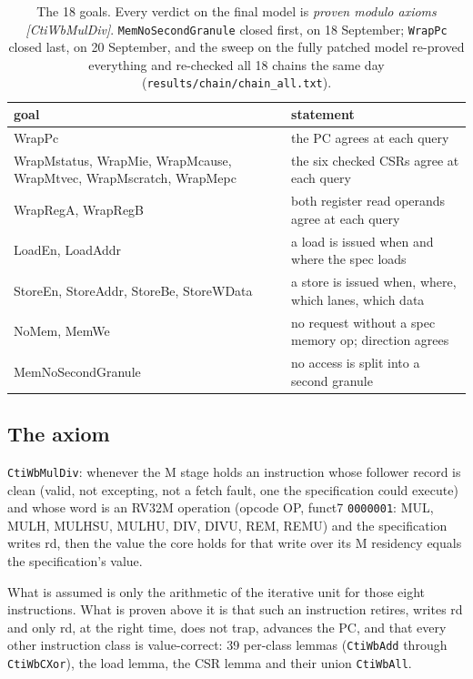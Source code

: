 \documentclass[11pt]{article}
\newcommand{\code}[1]{\texttt{#1}}
\begin{document}
\begin{table}[h]
\centering
\small
\begin{tabular}{p{}p{}}
\toprule
goal & statement \\
\midrule
WrapPc & the PC agrees at each query \\
WrapMstatus, WrapMie, WrapMcause, WrapMtvec, WrapMscratch, WrapMepc & the six checked CSRs agree at each query \\
WrapRegA, WrapRegB & both register read operands agree at each query \\
LoadEn, LoadAddr & a load is issued when and where the spec loads \\
StoreEn, StoreAddr, StoreBe, StoreWData & a store is issued when, where, which lanes, which data \\
NoMem, MemWe & no request without a spec memory op; direction agrees \\
MemNoSecondGranule & no access is split into a second granule \\
\bottomrule
\end{tabular}
\caption{The 18 goals. Every verdict on the final model is \emph{proven modulo
axioms [CtiWbMulDiv]}. \code{MemNoSecondGranule} closed first, on 18
September; \code{WrapPc} closed last, on 20 September, and the sweep on the
fully patched model re-proved everything and re-checked all 18 chains the same
day (\code{results/chain/chain\_all.txt}).}
\label{tab:goals}
\end{table}

\subsection{The axiom}

\code{CtiWbMulDiv}: whenever the M stage holds an instruction whose follower
record is clean (valid, not excepting, not a fetch fault, one the specification
could execute) and whose word is an RV32M operation (opcode OP, funct7
\code{0000001}: MUL, MULH, MULHSU, MULHU, DIV, DIVU, REM, REMU) and the
specification writes rd, then the value the core holds for that write over its
M residency equals the specification's value.

What is assumed is only the arithmetic of the iterative unit for those eight
instructions. What is proven above it is that such an instruction retires,
writes rd and only rd, at the right time, does not trap, advances the PC, and
that every other instruction class is value-correct: 39 per-class lemmas
(\code{CtiWbAdd} through \code{CtiWbCXor}), the load lemma, the CSR lemma and
their union \code{CtiWbAll}.
\end{document}
